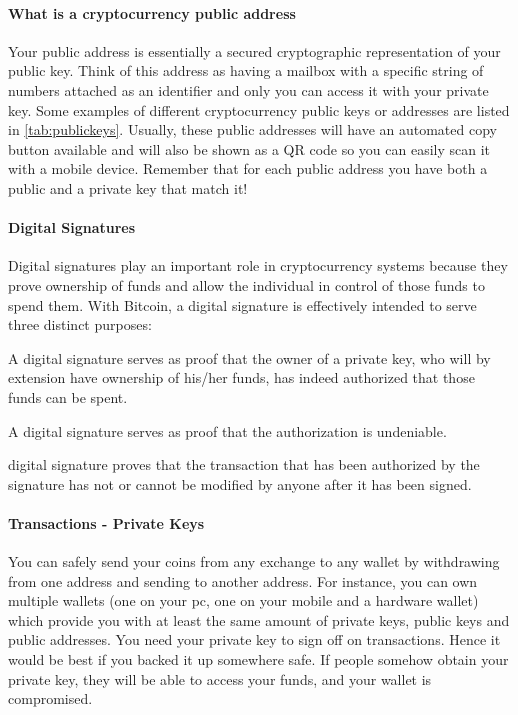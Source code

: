\paragraph{What is a cryptocurrency public address}
Your public address is essentially a secured cryptographic representation of your public key. Think of this address as having a mailbox with a specific string of numbers attached as an identifier and only you can access it with your private key. Some examples of different cryptocurrency public keys or addresses are listed in \cref{tab:publickeys}. Usually, these public addresses will have an automated copy button available and will also be shown as a QR code so you can easily scan it with a mobile device. Remember that for each public address you have both a public and a private key that match it!


\paragraph{Digital Signatures}
Digital signatures play an important role in cryptocurrency systems because they prove ownership of funds and allow the individual in control of those funds to spend them. With Bitcoin, a digital signature is effectively intended to serve three distinct purposes:
\item{A digital signature serves as proof that the owner of a private key, who will by extension have ownership of his/her funds, has indeed authorized that those funds can be spent.}
\item{A digital signature serves as proof that the authorization is undeniable.}
\item{digital signature proves that the transaction that has been authorized by the signature has not or cannot be modified by anyone after it has been signed.}
 
 
\paragraph{Transactions - Private Keys}
You can safely send your coins from any exchange to any wallet by withdrawing from one address and sending to another address. For instance, you can own multiple wallets (one on your pc, one on your mobile and a hardware wallet) which provide you with at least the same amount of private keys, public keys and public addresses. You need your private key to sign off on transactions. Hence it would be best if you backed it up somewhere safe. If people somehow obtain your private key, they will be able to access your funds, and your wallet is compromised.


